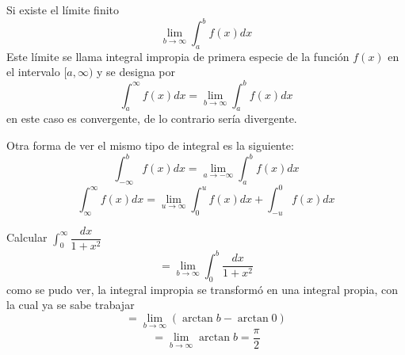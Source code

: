 \documentclass[10pt,twoside]{SelfArx} %
\begin{document}
 \begin{thm}
 	Si existe el límite finito
 	\begin{equation}
 	\lim\limits_{b\rightarrow\infty}\int_{a}^{b}f(x)dx
 	\end{equation}
 	Este límite se llama integral impropia de primera especie de la función $ f(x) $ en el intervalo $ [a,\infty) $ y se designa por 
 	\begin{equation}
 	\int_{a}^{\infty}f(x)dx=\lim\limits_{b\rightarrow\infty}\int_{a}^{b}f(x)dx
 	\end{equation}
 	en este caso es convergente, de lo contrario sería divergente.
 \end{thm}
 Otra forma de ver el mismo tipo de integral es la siguiente:
 \begin{equation}
 \int_{-\infty}^{b}f(x)dx=\lim\limits_{a\rightarrow-\infty}\int_{a}^{b}f(x)dx
 \end{equation}
 \begin{equation}
\int_{\infty}^{\infty}f(x)dx=\lim\limits_{u\rightarrow\infty}\int_{0}^{u}f(x)dx+\int_{-u}^{0}f(x)dx
 \end{equation}
\begin{ejemplo}
Calcular $ 	\int_{0}^{\infty}\dfrac{dx}{1+x^{2}} $
\begin{equation}
=	\lim\limits_{b\rightarrow\infty}\int_{0}^{b}\dfrac{dx}{1+x^{2}} 
\end{equation}
como se pudo ver, la integral impropia se transformó en una integral propia, con la cual ya se sabe trabajar
\begin{equation}
=	\lim\limits_{b\rightarrow\infty}(\arctan b- \arctan 0)
\end{equation}
\begin{equation}
=	\lim\limits_{b\rightarrow\infty}\arctan b=\dfrac{\pi}{2}
\end{equation}
\end{ejemplo}
\end{document}
